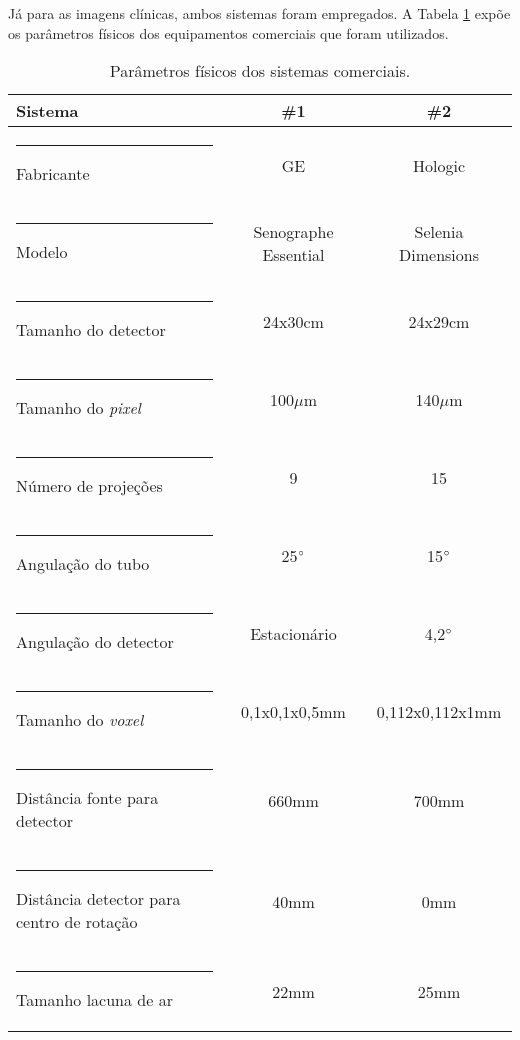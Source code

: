 Já para as imagens clínicas, ambos sistemas foram empregados. A Tabela \ref{tab:tabCap4ParametrosEquipamentos} expõe os parâmetros físicos dos equipamentos comerciais que foram utilizados.

\begin{table}[htb]
	\centering
	\caption{Parâmetros físicos dos sistemas comerciais.}
	\label{tab:tabCap4ParametrosEquipamentos}
	\begin{tabular}{l|c|c}
		\textbf{Sistema}                            &   \textbf{\#1}   &   \textbf{\#2}\\
		[5pt]
		\hline
		\hline
		\rule[-0.5ex]{-3pt}{3ex}
		Fabricante												& \acs{GE} & Hologic \\ \hline
		\rule[-0.5ex]{-3pt}{3ex}
		Modelo													&  Senographe Essential &  Selenia Dimensions\\ \hline
		\rule[-0.5ex]{-3pt}{3ex}
		Tamanho do detector 						  &      24x30cm  &      24x29cm      \\ \hline
		\rule[-0.5ex]{-3pt}{3ex}
		Tamanho do \textit{pixel}                     &     100$\mu$m  &     140$\mu$m     \\ \hline
		\rule[-0.5ex]{-3pt}{3ex}
		Número de projeções                           &         9 &         15         \\ \hline
		\rule[-0.5ex]{-3pt}{3ex}
		Angulação do tubo                             &    25$\degree$   &    15$\degree$    \\ \hline
		\rule[-0.5ex]{-3pt}{3ex}
		Angulação do detector                         &    Estacionário  &    4,2$\degree$  \\ \hline
		\rule[-0.5ex]{-3pt}{3ex}
		Tamanho do \textit{voxel}                     &   0,1x0,1x0,5mm   &   0,112x0,112x1mm \\ \hline
		\rule[-0.5ex]{-3pt}{3ex}
		Distância fonte para detector                 &       660mm  &       700mm       \\ \hline
		\rule[-0.5ex]{-3pt}{3ex}
		Distância detector para centro de rotação     &        40mm     &        0mm   \\ \hline
		\rule[-0.5ex]{-3pt}{3ex}
		Tamanho lacuna de ar                          &        22mm   &        25mm     \\ \hline
	\end{tabular}
	\vspace{2ex}
\end{table}

